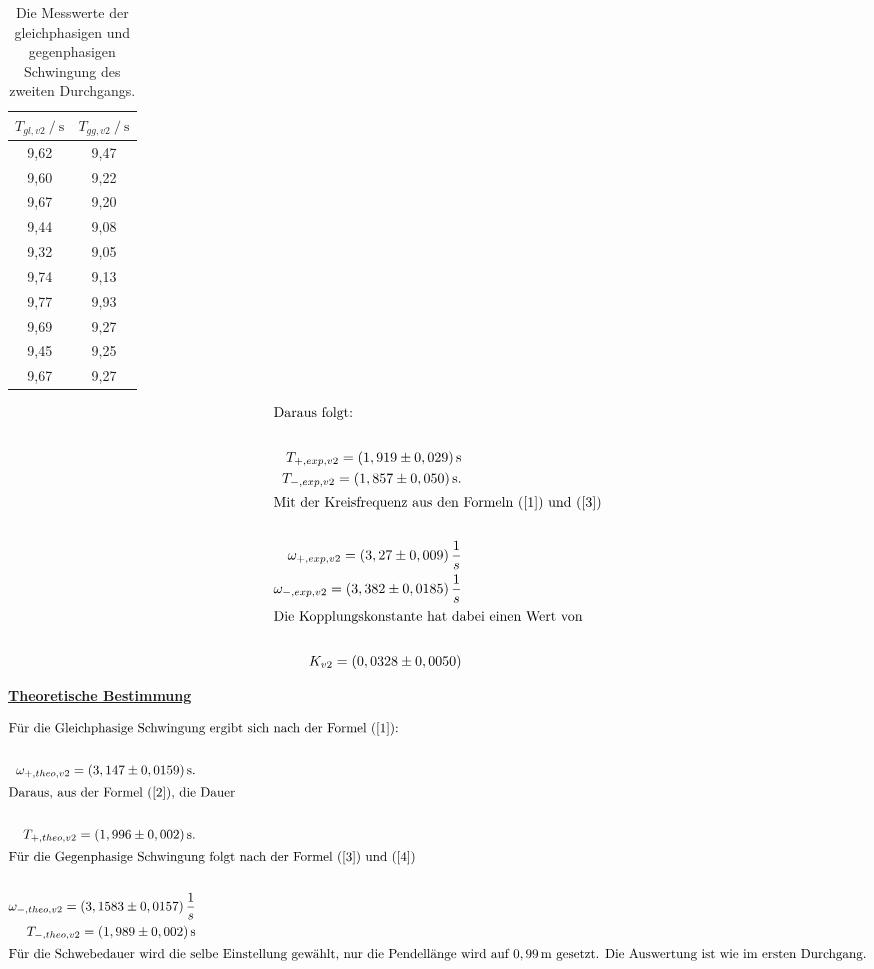 \begin{table}[H]
    \centering
    \caption{Die Messwerte der gleichphasigen und gegenphasigen Schwingung des zweiten Durchgangs.}
    \label{Tabelle6}
    \begin{tabular} {c  c}
        \toprule
        {$ T_{gl,v2 } \mathbin{/} \unit{\second} $} &
        {$ T_{gg,v2} \mathbin{/} \unit{\second} $} \\
        \midrule
        9,62 & 9,47 \\
        9,60 & 9,22 \\
        9,67 & 9,20 \\
        9,44 & 9,08 \\
        9,32 & 9,05 \\
        9,74 & 9,13 \\
        9,77 & 9,93 \\
        9,69 & 9,27 \\
        9,45 & 9,25 \\
        9,67 & 9,27 \\
        \bottomrule
    \end{tabular} 
\end{table} 

\begin{align*}
    \intertext{Daraus folgt:}\\
    T_{+,exp,v2} = (1,919 \pm 0,029 )\, \unit{\second} \\
    T_{-,exp,v2} = (1,857 \pm 0,050 )\, \unit{\second}. \\
    \intertext{Mit der Kreisfrequenz aus den Formeln (\ref{1}) und (\ref{3})}\\
    \omega_{+,exp,v2} = (3,27 \pm 0,009 )\, \frac{1}{s}\\
    \omega_{-,exp,v2} = (3,382 \pm 0,0185 )\, \frac{1}{s}\\
    \intertext{Die Kopplungskonstante hat dabei einen Wert von}\\
    K_{v2} = ( 0,0328\pm 0,0050 )
\end{align*}


\underline{\textbf{Theoretische Bestimmung}}

\begin{align*}
    \intertext{Für die Gleichphasige Schwingung ergibt sich nach der Formel (\ref{1}):}\\
    \omega_{+,theo,v2} = (3,147 \pm 0,0159 )\, \unit{\second}.\\
    \intertext{Daraus, aus der Formel (\ref{2}), die Dauer}\\
    T_{+,theo,v2} = (1,996 \pm 0,002 )\, \unit{\second}.\\
    \intertext{Für die Gegenphasige Schwingung folgt nach der Formel (\ref{3}) und (\ref{4})} \\
    \omega_{-,theo,v2} = ( 3,1583 \pm 0,0157)\, \frac{1}{s}\\
    T_{-,theo,v2} = ( 1,989\pm 0,002 )\, \unit{\second}\\
    \intertext{Für die Schwebedauer wird die selbe Einstellung gewählt, nur die Pendellänge wird auf $ 0,99\, \unit{\meter} $ gesetzt.
    Die Auswertung ist wie im ersten Durchgang.}
\end{align*}

